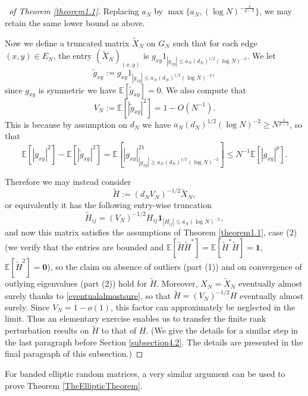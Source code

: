\documentclass[11pt,reqno]{amsart}
\theoremstyle{plain}
\theoremstyle{remark}
\numberwithin{equation}{section}
\begin{document}
\begin{proof}[\proofname\ of Theorem \ref{theorem1.1}]
   Replacing $a_N$ by $\max\{a_N,(\log N)^{-\frac{4}{p-2}}\}$, we may retain the same lower bound as above.

   Now we define a truncated matrix $\widetilde{X}_N$ on $G_N$ such that for each edge $(x,y)\in E_N$, the entry $(\widetilde{X}_N)_{(x,y)}$ is $g_{xy}1_{|g_{xy}|\leq a_N(d_N)^{1/2}(\log N)^{-2}}$. We let 
   $$
\widetilde{g}_{xy}:=g_{xy}1_{|g_{xy}|\leq a_N(d_N)^{1/2}(\log N)^{-2}},
   $$ since $g_{xy}$ is symmetric we have $\mathbb{E}[\widetilde{g}_{xy}]=0$. We also compute that  $$V_N:=\mathbb{E}[|\widetilde{g}_{xy}|^2]=1-O(N^{-1}) .$$ This is because by assumption on $d_N$ we have $a_N(d_N)^{1/2}(\log N)^{-2}\geq N^\frac{1}{p-2}$, so that 
   $$\mathbb{E}[|g_{xy}|^2]-\mathbb{E}[|\widetilde{g}_{xy}|^2]=\mathbb{E}[|g_{xy}|^21_{|g_{xy}|\geq a_N(d_N)^{1/2}(\log N)^{-2}}]\leq N^{-1}\mathbb{E}[|g_{xy}|^p].
   $$ 
   
   
   Therefore we may instead consider $$\widetilde{H}:=(d_NV_N)^{-1/2}\widetilde{X}_N,$$ or equivalently it has the following entry-wise truncation
   $$
   {\widetilde{H}}_{ij}=(V_N)^{-1/2}H_{ij}\mathbf{1}_{|H_{ij}|\leq a_N(\log N)^{-2}}
   ,$$and now this matrix satisfies the assumptions of Theorem \ref{theorem1.1}, case (2) (we verify that the entries are bounded and $\mathbb{E}[\widetilde{H}\widetilde{H}^*]=\mathbb{E}[\widetilde{H}^*\widetilde{H}]=\mathbf{1}$, $\mathbb{E}[\widetilde{H}^2]=\mathbf{0}$), so the claim on absence of outliers (part (1)) and on convergence of outlying eigenvalues (part (2)) hold for $\widetilde{H}$. Moreover, $X_N=\widetilde{X}_N$ eventually almost surely thanks to \eqref{eventualalmostsure}, so that $\widetilde{H}=(V_N)^{-1/2}H$ eventually almost surely. Since $V_N=1-o(1)$, this factor can approximately be neglected in the limit. Thus an elementary exercise enables us to transfer the finite rank perturbation results on $\widetilde{H}$ to that of $H$. (We give the details for a similar step in the last paragraph before Section \ref{subsection4.2}. The details are presented in the final paragraph of this subsection.)
\end{proof}

For banded elliptic random matrices, a very similar argument can be used to prove Theorem \ref{TheEllipticTheorem}.
\end{document}
